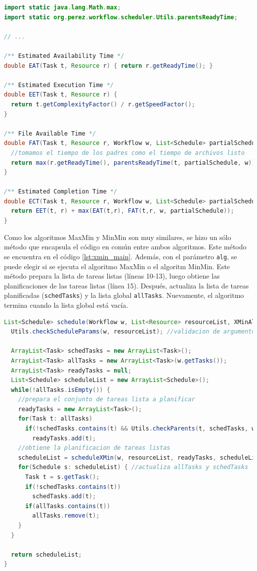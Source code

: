 \begin{lstlisting}[language=java,label={code:xmin_defs},caption={Definiciones comunes para MaxMin y MinMin.},float]
import static java.lang.Math.max; 
import static org.perez.workflow.scheduler.Utils.parentsReadyTime;

// ...

/** Estimated Availability Time */
double EAT(Task t, Resource r) { return r.getReadyTime(); }

/** Estimated Execution Time */
double EET(Task t, Resource r) { 
  return t.getComplexityFactor() / r.getSpeedFactor(); 
}

/** File Available Time */
double FAT(Task t, Resource r, Workflow w, List<Schedule> partialSchedule) {
  //tomamos el tiempo de los padres como el tiempo de archivos listo
  return max(r.getReadyTime(), parentsReadyTime(t, partialSchedule, w));
}

/** Estimated Completion Time */
double ECT(Task t, Resource r, Workflow w, List<Schedule> partialSchedule) {
  return EET(t, r) + max(EAT(t,r), FAT(t,r, w, partialSchedule));
}
\end{lstlisting}

Como los algoritmos MaxMin y MinMin son muy similares, se hizo un sólo método que encapsula el código en común entre ambos algoritmos. Este método se encuentra en el código \ref{lst:xmin_main}. Además, con el parámetro \texttt{alg}, se puede elegir si se ejecuta el algoritmo MaxMin o el algoritm MinMin. Este método prepara la lista de tareas listas (líneas 10-13), luego obtiene las planificaciones de las tareas listas (línea 15). Después, actualiza la lista de tareas planificadas (\texttt{schedTasks}) y la lista global \texttt{allTasks}. Nuevamente, el algoritmo termina cuando la lista global está vacía.

\begin{lstlisting}[language=java,label={lst:xmin_main},caption={Método principal para los algoritmos MaxMin y MinMin.},float]
List<Schedule> schedule(Workflow w, List<Resource> resourceList, XMinAlgorithm alg) {
  Utils.checkScheduleParams(w, resourceList); //validacion de argumentos

  ArrayList<Task> schedTasks = new ArrayList<Task>();
  ArrayList<Task> allTasks = new ArrayList<Task>(w.getTasks());
  ArrayList<Task> readyTasks = null;
  List<Schedule> scheduleList = new ArrayList<Schedule>();
  while(!allTasks.isEmpty()) {
    //prepara el conjunto de tareas lista a planificar
    readyTasks = new ArrayList<Task>();
    for(Task t: allTasks)
      if(!schedTasks.contains(t) && Utils.checkParents(t, schedTasks, w))
        readyTasks.add(t);
    //obtiene la planificacion de tareas listas
    scheduleList = scheduleXMin(w, resourceList, readyTasks, scheduleList, alg);
    for(Schedule s: scheduleList) { //actualiza allTasks y schedTasks
      Task t = s.getTask();
      if(!schedTasks.contains(t))
        schedTasks.add(t);
      if(allTasks.contains(t))
        allTasks.remove(t);
    }
  }

  return scheduleList;
}
\end{lstlisting}

